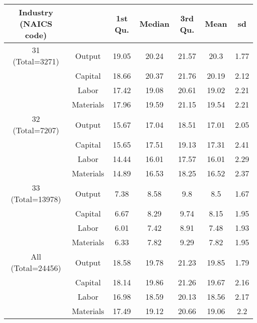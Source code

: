 \begin{table}[H]
\centering
\begin{tabular}{ccccccc}
  \hline\hline Industry (NAICS code) &   & 1st Qu. & Median & 3rd Qu. & Mean & sd \\ 
  \hline
31 (Total=3271) & Output & 19.05 & 20.24 & 21.57 & 20.3 & 1.77 \\ 
   & Capital & 18.66 & 20.37 & 21.76 & 20.19 & 2.12 \\ 
   & Labor & 17.42 & 19.08 & 20.61 & 19.02 & 2.21 \\ 
   & Materials & 17.96 & 19.59 & 21.15 & 19.54 & 2.21 \\ 
  32 (Total=7207) & Output & 15.67 & 17.04 & 18.51 & 17.01 & 2.05 \\ 
   & Capital & 15.65 & 17.51 & 19.13 & 17.31 & 2.41 \\ 
   & Labor & 14.44 & 16.01 & 17.57 & 16.01 & 2.29 \\ 
   & Materials & 14.89 & 16.53 & 18.25 & 16.52 & 2.37 \\ 
  33 (Total=13978) & Output & 7.38 & 8.58 & 9.8 & 8.5 & 1.67 \\ 
   & Capital & 6.67 & 8.29 & 9.74 & 8.15 & 1.95 \\ 
   & Labor & 6.01 & 7.42 & 8.91 & 7.48 & 1.93 \\ 
   & Materials & 6.33 & 7.82 & 9.29 & 7.82 & 1.95 \\ 
  All (Total=24456) & Output & 18.58 & 19.78 & 21.23 & 19.85 & 1.79 \\ 
   & Capital & 18.14 & 19.86 & 21.26 & 19.67 & 2.16 \\ 
   & Labor & 16.98 & 18.59 & 20.13 & 18.56 & 2.17 \\ 
   & Materials & 17.49 & 19.12 & 20.66 & 19.06 & 2.2 \\ 
   \hline
\end{tabular}
\end{table}
